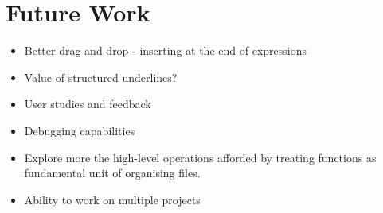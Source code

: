 \section{Future Work}

\begin{itemize}[noitemsep]
	\item Better drag and drop - inserting at the end of expressions
	\item Value of structured underlines?
	\item User studies and feedback
	\item Debugging capabilities
	\item Explore more the high-level operations afforded by treating functions as
	fundamental unit of organising files.
	\item Ability to work on multiple projects
\end{itemize}